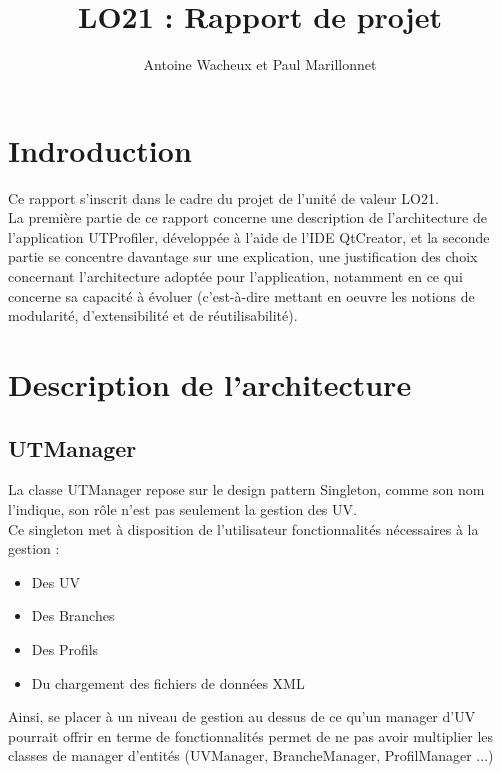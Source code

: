 \documentclass[a4paper,10pt,french]{report}
\begin{document}
\author{Antoine Wacheux et Paul Marillonnet}
\title{LO21 : Rapport de projet}\maketitle

\tableofcontents
\newpage



\section*{Indroduction}\label{sec:Introduction}

Ce rapport s'inscrit dans le cadre du projet de l'unité de valeur LO21.\\
La première partie de ce rapport concerne une description de l'architecture de l'application UTProfiler, développée à l'aide de l'IDE QtCreator, et la seconde partie se concentre davantage sur une explication, une justification des choix concernant l'architecture adoptée pour l'application, notamment en ce qui concerne sa capacité à évoluer (c'est-à-dire mettant en oeuvre les notions de modularité, d'extensibilité et de réutilisabilité).

\newpage
\section{Description de l'architecture}\label{sec:I}



	\subsection{UTManager}\label{subsec:UTManager}
	
	La classe UTManager repose sur le design pattern Singleton, comme son nom l'indique, son rôle n'est pas seulement la gestion des UV. \\
	Ce singleton met à disposition de l'utilisateur fonctionnalités nécessaires à la gestion :
	\begin{itemize}
	\item Des UV
	\item Des Branches
	\item Des Profils
	\item Du chargement des fichiers de données XML	
	\end{itemize}
	Ainsi, se placer à un niveau de gestion au dessus de ce qu'un manager d'UV pourrait offrir en terme de fonctionnalités permet de ne pas avoir multiplier les classes de manager d'entités (UVManager, BrancheManager, ProfilManager ...)
\end{document}
